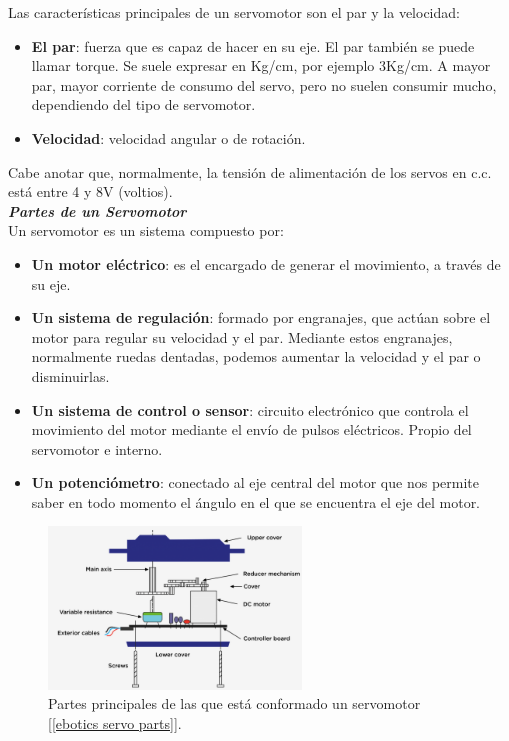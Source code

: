 \documentclass[12pt]{article}
\begin{document}
	\noindent Las características principales de un servomotor son el par y la velocidad:
	
	\begin{itemize}
		\item \textbf{El par}: fuerza que es capaz de hacer en su eje. El par también se puede llamar torque. Se suele expresar en Kg/cm, por ejemplo 3Kg/cm. A mayor par, mayor corriente de consumo del servo, pero no suelen consumir mucho, dependiendo del tipo de servomotor.
		\item \textbf{Velocidad}: velocidad angular o de rotación.
	\end{itemize}

	\noindent Cabe anotar que, normalmente, la tensión de alimentación de los servos en c.c. está entre 4 y 8V (voltios).\\ 
	
	\noindent \textit{\textbf{Partes de un Servomotor}}\\
	
	\noindent Un servomotor es un sistema compuesto por: 
	
	\begin{itemize}
		\item \textbf{Un motor eléctrico}: es el encargado de generar el movimiento, a través de su eje.
		\item \textbf{Un sistema de regulación}: formado por engranajes, que actúan sobre el motor para regular su velocidad y el par. Mediante estos engranajes, normalmente ruedas dentadas, podemos aumentar la velocidad y el par o disminuirlas.
		\item \textbf{Un sistema de control o sensor}: circuito electrónico que controla el movimiento del motor mediante el envío de pulsos eléctricos. Propio del servomotor e interno.
		\item \textbf{Un potenciómetro}: conectado al eje central del motor que nos permite saber en todo momento el ángulo en el que se encuentra el eje del motor. %
	\end{itemize}
	
	\begin{figure}[h]
		\begin{center}
			\includegraphics[width=0.6\textwidth]{img/servo_parts.png}
			\caption{Partes principales de las que está conformado un servomotor [\ref{ebotics servo parts}].}
			\label{servo parts}
		\end{center}
	\end{figure}
\end{document}
